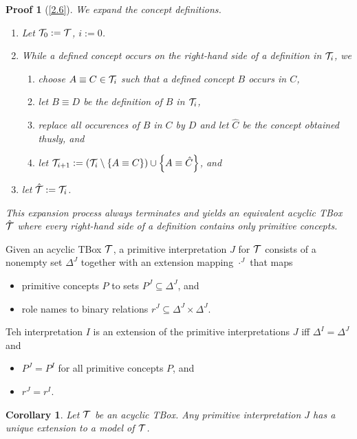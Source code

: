 \documentclass[openany]{scrbook}
\theoremstyle{break}
\newtheorem{Corollary}[Theorem]{Corollary}
\theoremstyle{nonumberbreak}
\theoremstyle{nonumberplain}
\theoremstyle{nonumberbreak}
\newtheorem{Proof}{Proof}
\newcommand{\set}[1]{\left\{#1\right\}}
\begin{document}
\begin{Proof}[\cref{2.6}]
  We expand the concept definitions.
  \begin{enumerate}
  \item Let ${\cal T}_0 := {\cal T}$, $i := 0$.
  \item While a defined concept occurs on the right-hand side of a
    definition in ${\cal T}_i$, we
    \begin{enumerate}
    \item choose $A \equiv C \in {\cal T}_i$ such that a defined
      concept $B$ occurs in $C$,
    \item let $B \equiv D$ be the definition of $B$ in ${\cal T}_i$,
    \item replace all occurences of $B$ in $C$ by $D$ and let
      $\hat{C}$ be the concept obtained thusly, and
    \item let ${\cal T}_{i + 1} := ({\cal T}_i \setminus \set{A \equiv
        C}) \cup \set{A \equiv \hat{C}}$, and
    \end{enumerate}
  \item let $\hat{\cal T} := {\cal T}_i$.
  \end{enumerate}

  This expansion process always terminates and yields an equivalent
  acyclic TBox $\hat{\cal T}$ where every right-hand side of a
  definition contains only primitive concepts.
\end{Proof}

Given an acyclic TBox ${\cal T}$, a primitive interpretation $J$ for
${\cal T}$ consists of a nonempty set $\Delta^J$ together with an
extension mapping $\cdot^J$ that maps
\begin{itemize}
\item primitive concepts $P$ to sets $P^J \subseteq \Delta^J$, and
\item role names to binary relations $r^J \subseteq \Delta^J \times
  \Delta^J$.
\end{itemize}

Teh interpretation $I$ is an extension of the primitive
interpretations $J$ iff $\Delta^I = \Delta^J$ and
\begin{itemize}
\item $P^J = P^I$ for all primitive concepts $P$, and
\item $r^J = r^I$.
\end{itemize}

\begin{Corollary}
  \label{2.7}
  Let ${\cal T}$ be an acyclic TBox. Any primitive interpretation $J$
  has a unique extension to a model of ${\cal T}$.
\end{Corollary}
\end{document}
